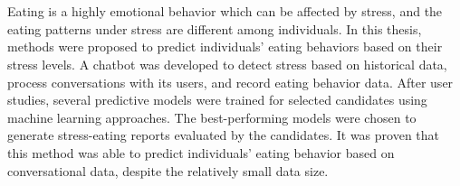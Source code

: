 \chapter{\abstractname}

Eating is a highly emotional behavior which can be affected by stress, and the eating patterns under stress are different among individuals. In this thesis, methods were proposed to predict individuals' eating behaviors based on their stress levels. A chatbot was developed to detect stress based on historical data, process conversations with its users, and record eating behavior data. After user studies, several predictive models were trained for selected candidates using machine learning approaches. The best-performing models were chosen to generate stress-eating reports evaluated by the candidates. It was proven that this method was able to predict individuals' eating behavior based on conversational data, despite the relatively small data size.
